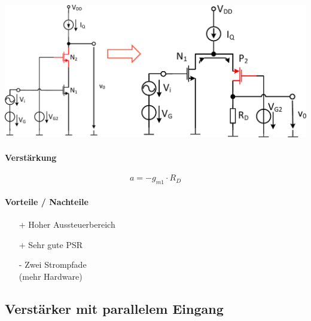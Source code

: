 \begin{minipage}[t]{0.68\columnwidth}
    \includegraphics[width=\columnwidth, align=t]{images/07_gefaltete_kaskode.pdf}
\end{minipage}
\hfill
\begin{minipage}[t]{0.3\columnwidth}

    \paragraph{Verstärkung} %

    \vspace{-0.3cm}

    \[
        a = - g_{m1} \cdot R_D
    \]

    \smallskip

    \paragraph{Vorteile / Nachteile}
    \raggedright

     \begin{itemize}
        \item[+] Hoher Aussteuerbereich
        \item[+] Sehr gute PSR
        \item[-] Zwei Strompfade\\
            (mehr Hardware)
     \end{itemize}
\end{minipage}


\subsection{Verstärker mit parallelem Eingang}

